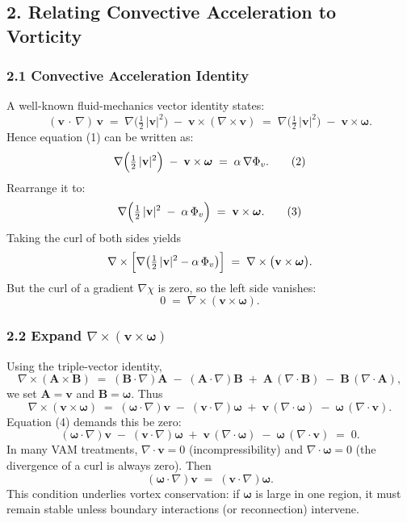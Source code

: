 \documentclass[a4paper,12pt]{article}
\begin{document}
\subsection*{2. Relating Convective Acceleration to Vorticity}

\subsubsection*{2.1 Convective Acceleration Identity}
A well-known fluid-mechanics vector identity states:
\[
    (\mathbf{v}\,\cdot\,\nabla)\,\mathbf{v}
    \;=\;
    \nabla\!\bigl(\tfrac12\,|\mathbf{v}|^2\bigr)
    \;-\;
    \mathbf{v}\times(\nabla\times \mathbf{v})
    \;=\;
    \nabla\bigl(\tfrac12\,|\mathbf{v}|^2\bigr)
    \;-\;
    \mathbf{v}\times \boldsymbol{\omega}.
\]
Hence equation (1) can be written as:
\[
    \nabla
    \Bigl(
    \tfrac12 \,\lvert \mathbf{v}\rvert^2
    \Bigr)
    \;-\;
    \mathbf{v}\times \boldsymbol{\omega}
    \;=\;
    \alpha \,\nabla \Phi_v.
    \tag{2}
\]
Rearrange it to:
\[
    \nabla
    \Bigl(
    \tfrac12\,|\mathbf{v}|^2
    \;-\;
    \alpha\,\Phi_v
    \Bigr)
    \;=\;
    \mathbf{v}\times \boldsymbol{\omega}.
    \tag{3}
\]
Taking the curl of both sides yields
\[
    \nabla \times \Bigl[
        \nabla\bigl(
        \tfrac12\,|\mathbf{v}|^2 - \alpha\,\Phi_v
        \bigr)
        \Bigr]
    \;=\;
    \nabla \times \bigl(\mathbf{v}\times \boldsymbol{\omega}\bigr).
\]
But the curl of a gradient \(\nabla \chi\) is zero, so the left side vanishes:
\[
    0
    \;=\;
    \nabla \times (\mathbf{v}\times \boldsymbol{\omega}).
    \tag{4}
\]

\subsubsection*{2.2 Expand \(\nabla \times (\mathbf{v}\times \boldsymbol{\omega})\)}
Using the triple-vector identity,
\[
    \nabla \times (\mathbf{A}\times \mathbf{B})
    \;=\;
    (\mathbf{B}\cdot\nabla)\mathbf{A}
    \;-\;
    (\mathbf{A}\cdot\nabla)\mathbf{B}
    \;+\;
    \mathbf{A}\,(\nabla\cdot \mathbf{B})
    \;-\;
    \mathbf{B}\,(\nabla\cdot \mathbf{A}),
\]
we set \(\mathbf{A} = \mathbf{v}\) and \(\mathbf{B} = \boldsymbol{\omega}\). Thus
\[
    \nabla \times (\mathbf{v}\times \boldsymbol{\omega})
    \;=\;
    (\boldsymbol{\omega}\cdot \nabla)\mathbf{v}
    \;-\;
    (\mathbf{v}\cdot \nabla)\boldsymbol{\omega}
    \;+\;
    \mathbf{v}\,(\nabla\cdot \boldsymbol{\omega})
    \;-\;
    \boldsymbol{\omega}\,(\nabla\cdot \mathbf{v}).
\]
Equation (4) demands this be zero:
\[
    (\boldsymbol{\omega}\cdot \nabla)\mathbf{v}
    \;-\;
    (\mathbf{v}\cdot \nabla)\boldsymbol{\omega}
    \;+\;
    \mathbf{v}\,(\nabla\cdot \boldsymbol{\omega})
    \;-\;
    \boldsymbol{\omega}\,(\nabla\cdot \mathbf{v})
    \;=\;
    0.
    \tag{5}
\]
In many VAM treatments, \(\nabla \cdot \mathbf{v} = 0\) (incompressibility) and \(\nabla \cdot \boldsymbol{\omega} = 0\) (the divergence of a curl is always zero). Then
\[
    (\boldsymbol{\omega}\cdot \nabla)\mathbf{v}
    \;=\;
    (\mathbf{v}\cdot \nabla)\boldsymbol{\omega}.
    \tag{6}
\]
This condition underlies vortex conservation: if \(\boldsymbol{\omega}\) is large in one region, it must remain stable unless boundary interactions (or reconnection) intervene.
\end{document}
